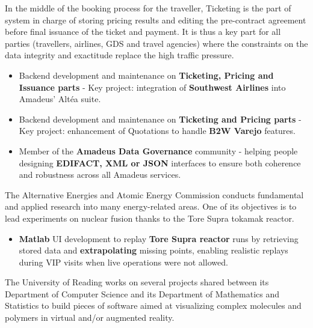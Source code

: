 \documentclass[10pt, a4paper, ragged2e]{altacv}
\begin{document}
\newpage

		In the middle of the booking process for the traveller, Ticketing is the part of system in charge of storing pricing results and editing the pre-contract agreement before final issuance of the ticket and payment. It is thus a key part for all parties (travellers, airlines, GDS and travel agencies) where the constraints on the data integrity and exactitude replace the high traffic pressure.

		\smallskip
		\begin{itemize}
			\item Backend development and maintenance on \textbf{Ticketing, Pricing and Issuance parts} - Key project: integration of \textbf{Southwest Airlines} into Amadeus' Altéa suite.
			\item Backend development and maintenance on \textbf{Ticketing and Pricing parts} - Key project: enhancement of Quotations to handle \textbf{B2W Varejo} features.
			\item Member of the \textbf{Amadeus Data Governance} community - helping people designing \textbf{EDIFACT, XML or JSON} interfaces to ensure both coherence and robustness across all Amadeus services.
		\end{itemize}
	\divider

		
		The Alternative Energies and Atomic Energy Commission conducts fundamental and applied research into many energy-related areas. One of its objectives is to lead experiments on nuclear fusion thanks to the Tore Supra tokamak reactor.
		
		\smallskip
		\begin{itemize}
			\item \textbf{Matlab} UI development to replay \textbf{Tore Supra reactor} runs by retrieving stored data and \textbf{extrapolating} missing points, enabling realistic replays during VIP visits when live operations were not allowed.
		\end{itemize}
	\divider

		
		The University of Reading works on several projects shared between its Department of Computer Science and its Department of Mathematics and Statistics to build pieces of software aimed at visualizing complex molecules and polymers in virtual and/or augmented reality. 
		
\end{document}
